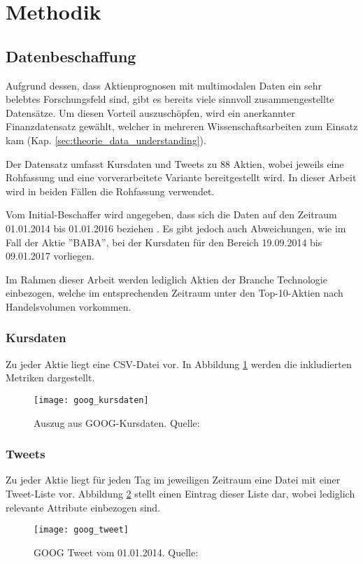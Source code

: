 \newpage
\section{Methodik}

\subsection{Datenbeschaffung}\label{sec:data_ingestion}
Aufgrund dessen, dass Aktienprognosen mit multimodalen Daten ein sehr belebtes Forschungsfeld sind, gibt es bereits viele sinnvoll zusammengestellte Datensätze. Um diesen Vorteil auszuschöpfen, wird ein anerkannter Finanzdatensatz gewählt, welcher in mehreren Wissenschaftsarbeiten zum Einsatz kam  (Kap. \ref{sec:theorie_data_understanding})\autocite{xu2018StockMovement}\autocite{Xu2020StockMovement}\autocite{zhang2022transformer}.

Der Datensatz umfasst Kursdaten und Tweets zu 88 Aktien, wobei jeweils eine Rohfassung und eine vorverarbeitete Variante bereitgestellt wird. In dieser Arbeit wird in beiden Fällen die Rohfassung verwendet. 

Vom Initial-Beschaffer wird angegeben, dass sich die Daten auf den Zeitraum 01.01.2014 bis 01.01.2016 beziehen \autocite[Kap. 3]{xu2018StockMovement}.
Es gibt jedoch auch Abweichungen, wie im Fall der Aktie ''BABA'', bei der Kursdaten für den Bereich 19.09.2014 bis 09.01.2017 vorliegen.

Im Rahmen dieser Arbeit werden lediglich Aktien der Branche Technologie einbezogen, welche im entsprechenden Zeitraum unter den Top-10-Aktien nach Handelsvolumen vorkommen. 

\subsubsection*{Kursdaten}\label{sec:data_ingestion_stockdata}
Zu jeder Aktie liegt eine \ac{CSV}-Datei vor. In Abbildung \ref{fig:goog_kursdaten} werden die inkludierten Metriken dargestellt.
\newpage
\begin{figure}[H]
	\texttt{[image: goog\_kursdaten]}
	\caption[Auszug aus GOOG-Kursdaten]{Auszug aus GOOG-Kursdaten. Quelle: \autocite{website:stocknet-dataset}}
	\label{fig:goog_kursdaten}
\end{figure}
 

\subsubsection*{Tweets}\label{sec:data_ingestion_tweetdata}
Zu jeder Aktie liegt für jeden Tag im jeweiligen Zeitraum eine Datei mit einer Tweet-Liste vor. Abbildung \ref{fig:goog_tweet} stellt einen Eintrag dieser Liste dar, wobei lediglich relevante Attribute einbezogen sind.
\begin{figure}[H]
	\texttt{[image: goog\_tweet]}
	\caption[GOOG Tweet vom 01.01.2014]{GOOG Tweet vom 01.01.2014. Quelle: \autocite{website:stocknet-dataset}}
	\label{fig:goog_tweet}
\end{figure}


